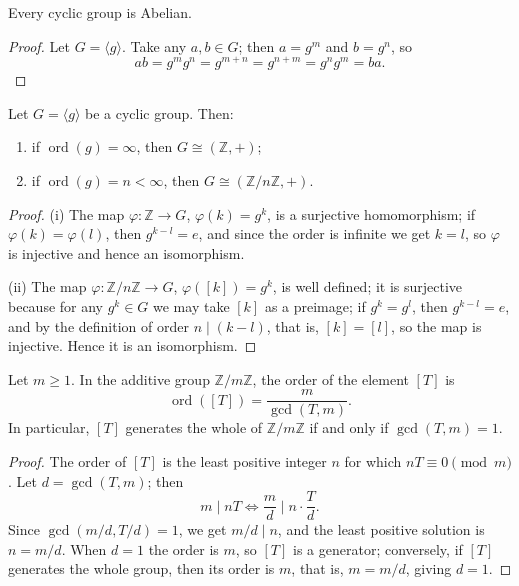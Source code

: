\begin{proposition}\label{prop:cyclic_abelian}
Every cyclic group is Abelian.
\end{proposition}

\begin{proof}
Let $G=\langle g\rangle$. Take any $a,b\in G$; then $a=g^m$ and $b=g^n$, so
\[
ab=g^m g^n=g^{m+n}=g^{n+m}=g^n g^m=ba.
\]
\end{proof}

\begin{proposition}\label{prop:cyclic_classification}
Let $G=\langle g\rangle$ be a cyclic group. Then:
\begin{enumerate}[label=(\roman*)]
    \item if $\operatorname{ord}(g)=\infty$, then $G\cong(\mathbb{Z},+)$;
    \item if $\operatorname{ord}(g)=n<\infty$, then $G\cong(\mathbb{Z}/n\mathbb{Z},+)$.
\end{enumerate}
\end{proposition}

\begin{proof}
(i) The map $\varphi:\mathbb{Z}\to G$, $\varphi(k)=g^k$, is a surjective homomorphism; if $\varphi(k)=\varphi(l)$, then $g^{k-l}=e$, and since the order is infinite we get $k=l$, so $\varphi$ is injective and hence an isomorphism.

(ii) The map $\varphi:\mathbb{Z}/n\mathbb{Z}\to G$, $\varphi([k])=g^k$, is well defined; it is surjective because for any $g^k\in G$ we may take $[k]$ as a preimage; if $g^k=g^l$, then $g^{k-l}=e$, and by the definition of order $n\mid(k-l)$, that is, $[k]=[l]$, so the map is injective. Hence it is an isomorphism.
\end{proof}

\begin{lemma}\label{lem:order_cyclic}
Let $m\ge 1$. In the additive group $\mathbb{Z}/m\mathbb{Z}$, the order of the element $[T]$ is
\[
\operatorname{ord}([T])=\frac{m}{\gcd(T,m)}.
\]
In particular, $[T]$ generates the whole of $\mathbb{Z}/m\mathbb{Z}$ if and only if $\gcd(T,m)=1$.
\end{lemma}

\begin{proof}
The order of $[T]$ is the least positive integer $n$ for which $nT\equiv 0\pmod m$. Let $d=\gcd(T,m)$; then
\[
m\mid nT \iff \frac{m}{d}\mid n\cdot\frac{T}{d}.
\]
Since $\gcd(m/d,T/d)=1$, we get $m/d\mid n$, and the least positive solution is $n=m/d$. When $d=1$ the order is $m$, so $[T]$ is a generator; conversely, if $[T]$ generates the whole group, then its order is $m$, that is, $m=m/d$, giving $d=1$.
\end{proof}

